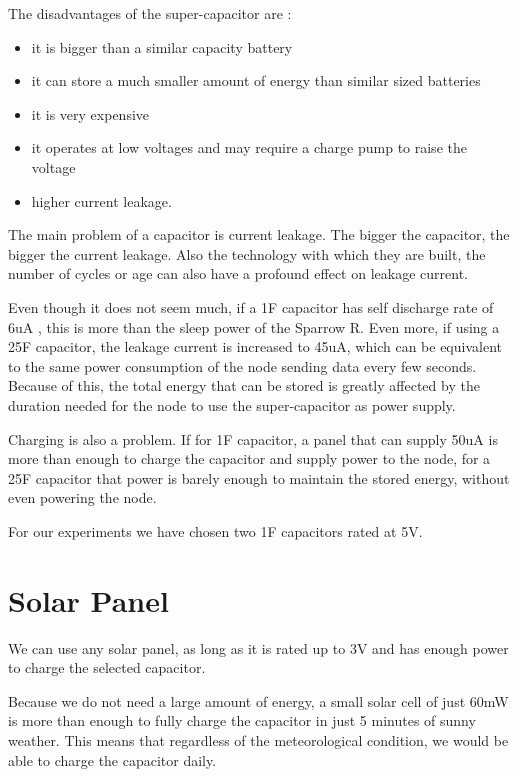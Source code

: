 The disadvantages of the super-capacitor are :

\begin{itemize}
\item it is bigger than a similar capacity battery
\item it can store a much smaller amount of energy than similar sized batteries
\item it is very expensive
\item it operates at low voltages and may require a charge pump to raise the voltage
\item higher current leakage.

\end{itemize}

The main problem of a capacitor is current leakage. The bigger the capacitor, the bigger the
current leakage. Also the technology with which they are built, the number of cycles or age can
also have a profound effect on leakage current.

Even though it does not seem much, if a 1F capacitor has self discharge rate of 6uA
\cite{ultracap}, this is more than the sleep power of the Sparrow R. Even more, if using a 25F
capacitor, the leakage current is increased to 45uA, which can be equivalent to the same power
consumption of the node sending data every few seconds. Because of this, the total energy that can
be stored is greatly affected by the duration needed for the node to use the super-capacitor as
power supply.

Charging is also a problem. If for 1F capacitor, a panel that can supply 50uA is more than enough to charge
the capacitor and supply power to the node, for a 25F capacitor that power is barely enough
to maintain the stored energy, without even powering the node.

For our experiments we have chosen two 1F capacitors rated at 5V.

\section{Solar Panel}

We can use any solar panel, as long as it is rated up to 3V and has enough power to charge the
selected capacitor.

Because we do not need a large amount of energy, a small solar cell of just 60mW is more than
enough to fully charge the capacitor in just 5 minutes of sunny weather. This means that regardless
of the meteorological condition, we would be able to charge the capacitor daily.

